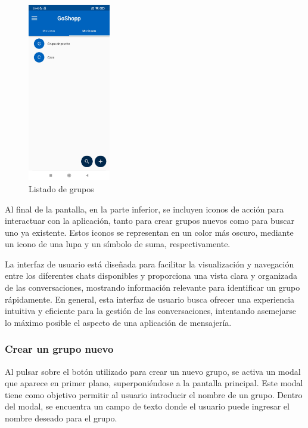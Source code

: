 \documentclass{article}
\begin{document}
\begin{figure}
    \includegraphics[width=0.32\textwidth]{imagenes/pantallas/grupos/grupos.jpg}
    \caption{Listado de grupos}
    \vspace{-5\intextsep}
\end{figure}

Al final de la pantalla, en la parte inferior, se incluyen iconos de acción para interactuar con la aplicación, tanto para crear grupos nuevos como para buscar uno ya existente. Estos iconos se representan en un color más oscuro, mediante un icono de una lupa y un símbolo de suma, respectivamente.

La interfaz de usuario está diseñada para facilitar la visualización y navegación entre los diferentes chats disponibles y proporciona una vista clara y organizada de las conversaciones, mostrando información relevante para identificar un grupo rápidamente. En general, esta interfaz de usuario busca ofrecer una experiencia intuitiva y eficiente para la gestión de las conversaciones, intentando asemejarse lo máximo posible el aspecto de una aplicación de mensajería.

\subsubsection{Crear un grupo nuevo}

Al pulsar sobre el botón utilizado para crear un nuevo grupo, se activa un modal que aparece en primer plano, superponiéndose a la pantalla principal. Este modal tiene como objetivo permitir al usuario introducir el nombre de un grupo. Dentro del modal, se encuentra un campo de texto donde el usuario puede ingresar el nombre deseado para el grupo.
\end{document}
